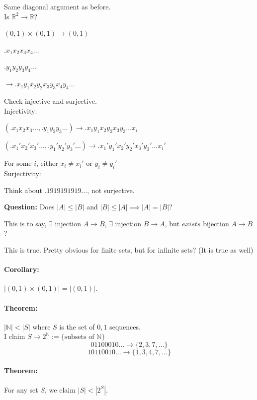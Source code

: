\documentclass[a4paper, 11pt, twoside]{article}
\begin{document}
Same diagonal argument as before.\\

Is $\mathbb{R}^2\to \mathbb{R}$?

$(0,1)\times(0,1)\to (0,1)$

$.x_1x_2x_3x_4\dots$

$.y_1y_2y_3y_4\dots$

$\to .x_1y_1x_2y_2x_3y_3x_4y_4\dots$

Check injective and surjective.\\

Injectivity:

$(.x_1x_2x_3\dots,.y_1y_2y_3\dots)\to .x_1y_1x_2y_2x_3y_3\dots x_i$

$(.x_1'x_2'x_3'\dots,.y_1'y_2'y_3'\dots)\to .x_1'y_1'x_2'y_2'x_3'y_3'\dots x_i'$

For some $i$, either $x_i\not=x_i'$ or $y_i\not=y_i'$\\

Surjectivity:

Think about $.1919191919\dots$, not surjective.

\textbf{Question:} Does $|A|\leq|B|$ and $|B|\leq|A| \implies |A|=|B|?$

This is to say, $\exists$ injection $A\to B$, $\exists$ injection $B\to A$, but $exists$ bijection $A\to B$?

This is true. Pretty obvious for finite sets, but for infinite sets? (It is true as well)\\

\paragraph{Corollary:} $|(0,1)\times(0,1)|=|(0,1)|$.

\paragraph{Theorem:} $|\mathbb{N}| < |S|$ where $S$ is the set of $0,1$ sequences.\\

I claim $S\to 2^{\mathbb{N}}:=\{\text{subsets of }\mathbb{N}\}$\\

\[01100010\dots \to \{2,3,7,\dots\}\]
\[10110010\dots \to \{1,3,4,7,\dots\}\]

\paragraph{Theorem:} For any set $S$, we claim $|S|<|2^{S}|$.\\
\end{document}
